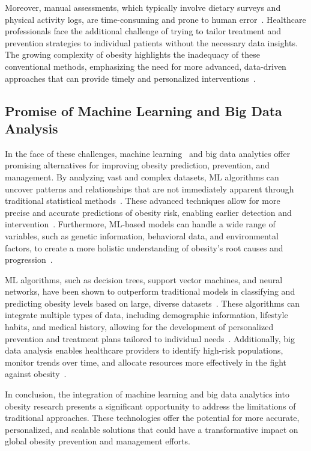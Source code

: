 \documentclass[12pt, a4paper]{article}
\begin{document}
Moreover, manual assessments, which typically involve dietary surveys and physical
activity logs, are time-consuming and prone to human error~\cite{pierson2000}.
Healthcare professionals face the additional challenge of trying to tailor treatment
and prevention strategies to individual patients without the necessary data insights.
The growing complexity of obesity highlights the inadequacy of these conventional
methods, emphasizing the need for more advanced, data-driven approaches that can
provide timely and personalized interventions~\cite{burton2005}.

\subsection{Promise of Machine Learning and Big Data Analysis}

In the face of these challenges, machine learning~\cite{jayswal2023plant} and big data
analytics offer promising alternatives for improving obesity prediction, prevention,
and management. By analyzing vast and complex datasets, ML algorithms can uncover
patterns and relationships that are not immediately apparent through traditional
statistical methods~\cite{ferdowsy2021}. These advanced techniques allow for more
precise and accurate predictions of obesity risk, enabling earlier detection and
intervention~\cite{esteva2019}. Furthermore, ML-based models can handle a wide range
of variables, such as genetic information, behavioral data, and environmental
factors, to create a more holistic understanding of obesity's root causes and
progression~\cite{esteva2019}.

ML algorithms, such as decision trees, support vector machines, and neural networks,
have been shown to outperform traditional models in classifying and predicting obesity
levels based on large, diverse datasets~\cite{cervantes2020}. These algorithms can
integrate multiple types of data, including demographic information, lifestyle habits,
and medical history, allowing for the development of personalized prevention and
treatment plans tailored to individual needs~\cite{ferdowsy2021}. Additionally, big
data analysis enables healthcare providers to identify high-risk populations, monitor
trends over time, and allocate resources more effectively in the fight against
obesity~\cite{esteva2019}.

In conclusion, the integration of machine learning and big data analytics into obesity
research presents a significant opportunity to address the limitations of traditional
approaches. These technologies offer the potential for more accurate, personalized, and
scalable solutions that could have a transformative impact on global obesity prevention
and management efforts.
\end{document}
